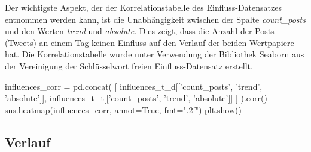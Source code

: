 \documentclass{article}
\begin{document}
Der wichtigste Aspekt, der der Korrelationstabelle des Einfluss-Datensatzes entnommen werden kann, ist die Unabhängigkeit zwischen der Spalte \textit{count\_posts} und den Werten \textit{trend} und \textit{absolute}.
	Dies zeigt, dass die Anzahl der Posts (Tweets) an einem Tag keinen Einfluss auf den Verlauf der beiden Wertpapiere hat.
	Die Korrelationstabelle wurde unter Verwendung der Bibliothek Seaborn aus der Vereinigung der Schlüsselwort freien Einfluss-Datensatz erstellt.
	\begin{python}
	influences_corr = pd.concat(
	    [
	        influences_t_d[['count_posts', 'trend', 'absolute']],
	        influences_t_t[['count_posts', 'trend', 'absolute']]
	    ]
	).corr()
	sns.heatmap(influences_corr, annot=True, fmt=".2f")
	plt.show()
	\end{python}

\newpage

\subsection{Verlauf} \label{VerlaufSub}
\end{document}
